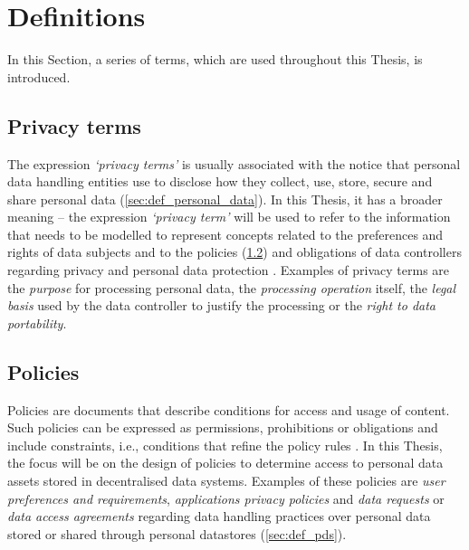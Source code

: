 \section{Definitions}
\label{sec:definitions}

In this Section, a series of terms, which are used throughout this Thesis, is introduced.

\subsection{Privacy terms}
\label{sec:def_privacy_terms}

The expression \textit{`privacy terms'} is usually associated with the notice that personal data handling entities use to disclose how they collect, use, store, secure and share personal data (\ref{sec:def_personal_data}).
In this Thesis, it has a broader meaning -- the expression \textit{`privacy term'} will be used to refer to the information that needs to be modelled to represent concepts related to the preferences and rights of data subjects and to the policies (\ref{sec:def_policies}) and obligations of data controllers regarding privacy and personal data protection \citep{esteves_challenges_2021}.
Examples of privacy terms are the \textit{purpose} for processing personal data, the \textit{processing operation} itself, the \textit{legal basis} used by the data controller to justify the processing or the \textit{right to data portability}.

\subsection{Policies}
\label{sec:def_policies}

Policies are documents that describe conditions for access and usage of content. Such policies can be expressed as permissions, prohibitions or obligations and include constraints, i.e., conditions that refine the policy rules \citep{iannella_odrl_2018}.
In this Thesis, the focus will be on the design of policies to determine access to personal data assets stored in decentralised data systems. Examples of these policies are \textit{user preferences and requirements}, \textit{applications privacy policies} and \textit{data requests} or \textit{data access agreements} regarding data handling practices over personal data stored or shared through personal datastores (\ref{sec:def_pds}).

